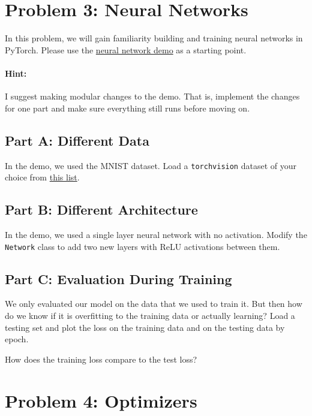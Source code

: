 \documentclass{article}
\begin{document}
%

\newpage
\section*{Problem 3: Neural Networks}

In this problem, we will gain familiarity building and training neural networks in PyTorch.
Please use the \href{https://colab.research.google.com/drive/1E3aJCFD5OI076r86OElgHMOy9iW6WfYv?usp=sharing}{neural network demo} as a starting point.

\paragraph{Hint:} I suggest making modular changes to the demo. That is, implement the changes for one part and make sure everything still runs before moving on.

\subsection*{Part A: Different Data}

In the demo, we used the MNIST dataset. Load a \texttt{torchvision} dataset of your choice from \href{https://pytorch.org/vision/main/datasets.html}{this list}.

\subsection*{Part B: Different Architecture}

In the demo, we used a single layer neural network with no activation. Modify the \texttt{Network} class to add two new layers with ReLU activations between them.

\subsection*{Part C: Evaluation During Training}

We only evaluated our model on the data that we used to train it. But then how do we know if it is overfitting to the training data or actually learning?
Load a testing set and plot the loss on the training data and on the testing data by epoch.

How does the training loss compare to the test loss?

%

\newpage
\section*{Problem 4: Optimizers}
\end{document}
